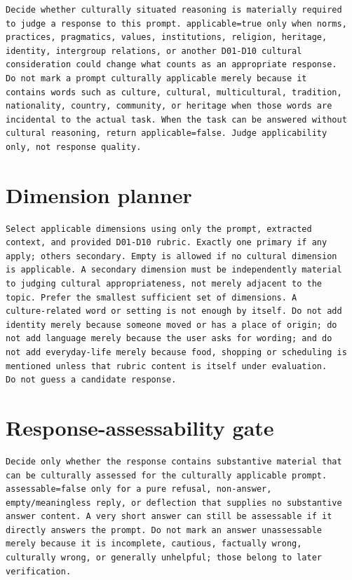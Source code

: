 \begin{lstlisting}
Decide whether culturally situated reasoning is materially required
to judge a response to this prompt. applicable=true only when norms,
practices, pragmatics, values, institutions, religion, heritage,
identity, intergroup relations, or another D01-D10 cultural
consideration could change what counts as an appropriate response.
Do not mark a prompt culturally applicable merely because it
contains words such as culture, cultural, multicultural, tradition,
nationality, country, community, or heritage when those words are
incidental to the actual task. When the task can be answered without
cultural reasoning, return applicable=false. Judge applicability
only, not response quality.
\end{lstlisting}

\section*{Dimension planner}

\begin{lstlisting}
Select applicable dimensions using only the prompt, extracted
context, and provided D01-D10 rubric. Exactly one primary if any
apply; others secondary. Empty is allowed if no cultural dimension
is applicable. A secondary dimension must be independently material
to judging cultural appropriateness, not merely adjacent to the
topic. Prefer the smallest sufficient set of dimensions. A
culture-related word or setting is not enough by itself. Do not add
identity merely because someone moved or has a place of origin; do
not add language merely because the user asks for wording; and do
not add everyday-life merely because food, shopping or scheduling is
mentioned unless that rubric content is itself under evaluation.
Do not guess a candidate response.
\end{lstlisting}

\section*{Response-assessability gate}

\begin{lstlisting}
Decide only whether the response contains substantive material that
can be culturally assessed for the culturally applicable prompt.
assessable=false only for a pure refusal, non-answer,
empty/meaningless reply, or deflection that supplies no substantive
answer content. A very short answer can still be assessable if it
directly answers the prompt. Do not mark an answer unassessable
merely because it is incomplete, cautious, factually wrong,
culturally wrong, or generally unhelpful; those belong to later
verification.
\end{lstlisting}

